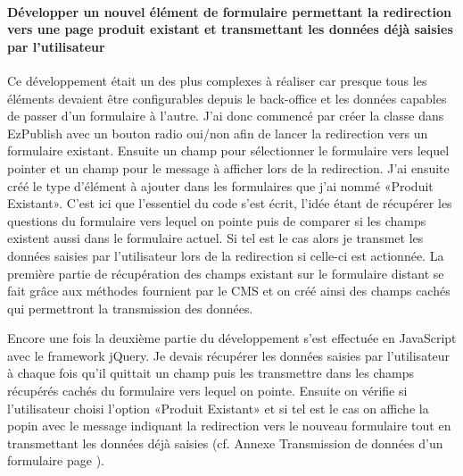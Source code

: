 \documentclass[a4paper,11pt,twoside]{report}
\begin{document}
      \paragraph*{Développer un nouvel élément de formulaire permettant la redirection vers une page produit existant et transmettant les données déjà saisies par l'utilisateur}
      Ce développement était un des plus complexes à réaliser car presque tous les éléments devaient être configurables depuis le back-office et les données capables de passer d'un formulaire à l'autre. J'ai donc commencé par créer la classe dans EzPublish avec un bouton radio oui/non afin de lancer la redirection vers un formulaire existant. Ensuite un champ pour sélectionner le formulaire vers lequel pointer et un champ pour le message à afficher lors de la redirection. 
      J'ai ensuite créé le type d'élément à ajouter dans les formulaires que j'ai nommé «Produit Existant». C'est ici que l'essentiel du code s'est écrit, l'idée étant de récupérer les questions du formulaire vers lequel on pointe puis de comparer si les champs existent aussi dans le formulaire actuel. Si tel est le cas alors je transmet les données saisies par l'utilisateur lors de la redirection si celle-ci est actionnée. 
      La première partie de récupération des champs existant sur le formulaire distant se fait grâce aux méthodes fournient par le CMS et on créé ainsi des champs cachés qui permettront la transmission des données. 
      
      Encore une fois la deuxième partie du développement s'est effectuée en JavaScript avec le framework jQuery. Je devais récupérer les données saisies par l'utilisateur à chaque fois qu'il quittait un champ puis les transmettre dans les champs récupérés cachés du formulaire vers lequel on pointe. Ensuite on vérifie si l'utilisateur choisi l'option «Produit Existant» et si tel est le cas on affiche la popin avec le message indiquant la redirection vers le nouveau formulaire tout en transmettant les données déjà saisies (cf. Annexe Transmission de données d'un formulaire page \pageref{transmission_de_donnees_d_un_formulaire}).
\end{document}

